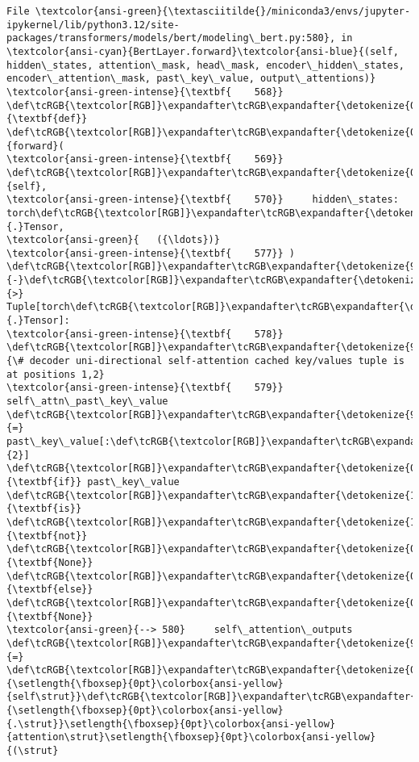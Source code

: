\documentclass[11pt]{article}
\begin{document}
\begin{Verbatim}[commandchars=\\\{\}, frame=single, framerule=2mm, rulecolor=\color{outerrorbackground}]
File \textcolor{ansi-green}{\textasciitilde{}/miniconda3/envs/jupyter-ipykernel/lib/python3.12/site-packages/transformers/models/bert/modeling\_bert.py:580}, in \textcolor{ansi-cyan}{BertLayer.forward}\textcolor{ansi-blue}{(self, hidden\_states, attention\_mask, head\_mask, encoder\_hidden\_states, encoder\_attention\_mask, past\_key\_value, output\_attentions)}
\textcolor{ansi-green-intense}{\textbf{    568}} \def\tcRGB{\textcolor[RGB]}\expandafter\tcRGB\expandafter{\detokenize{0,135,0}}{\textbf{def}} \def\tcRGB{\textcolor[RGB]}\expandafter\tcRGB\expandafter{\detokenize{0,0,255}}{forward}(
\textcolor{ansi-green-intense}{\textbf{    569}}     \def\tcRGB{\textcolor[RGB]}\expandafter\tcRGB\expandafter{\detokenize{0,135,0}}{self},
\textcolor{ansi-green-intense}{\textbf{    570}}     hidden\_states: torch\def\tcRGB{\textcolor[RGB]}\expandafter\tcRGB\expandafter{\detokenize{98,98,98}}{.}Tensor,
\textcolor{ansi-green}{   ({\ldots})}
\textcolor{ansi-green-intense}{\textbf{    577}} ) \def\tcRGB{\textcolor[RGB]}\expandafter\tcRGB\expandafter{\detokenize{98,98,98}}{-}\def\tcRGB{\textcolor[RGB]}\expandafter\tcRGB\expandafter{\detokenize{98,98,98}}{>} Tuple[torch\def\tcRGB{\textcolor[RGB]}\expandafter\tcRGB\expandafter{\detokenize{98,98,98}}{.}Tensor]:
\textcolor{ansi-green-intense}{\textbf{    578}}     \def\tcRGB{\textcolor[RGB]}\expandafter\tcRGB\expandafter{\detokenize{95,135,135}}{\# decoder uni-directional self-attention cached key/values tuple is at positions 1,2}
\textcolor{ansi-green-intense}{\textbf{    579}}     self\_attn\_past\_key\_value \def\tcRGB{\textcolor[RGB]}\expandafter\tcRGB\expandafter{\detokenize{98,98,98}}{=} past\_key\_value[:\def\tcRGB{\textcolor[RGB]}\expandafter\tcRGB\expandafter{\detokenize{98,98,98}}{2}] \def\tcRGB{\textcolor[RGB]}\expandafter\tcRGB\expandafter{\detokenize{0,135,0}}{\textbf{if}} past\_key\_value \def\tcRGB{\textcolor[RGB]}\expandafter\tcRGB\expandafter{\detokenize{175,0,255}}{\textbf{is}} \def\tcRGB{\textcolor[RGB]}\expandafter\tcRGB\expandafter{\detokenize{175,0,255}}{\textbf{not}} \def\tcRGB{\textcolor[RGB]}\expandafter\tcRGB\expandafter{\detokenize{0,135,0}}{\textbf{None}} \def\tcRGB{\textcolor[RGB]}\expandafter\tcRGB\expandafter{\detokenize{0,135,0}}{\textbf{else}} \def\tcRGB{\textcolor[RGB]}\expandafter\tcRGB\expandafter{\detokenize{0,135,0}}{\textbf{None}}
\textcolor{ansi-green}{--> 580}     self\_attention\_outputs \def\tcRGB{\textcolor[RGB]}\expandafter\tcRGB\expandafter{\detokenize{98,98,98}}{=} \def\tcRGB{\textcolor[RGB]}\expandafter\tcRGB\expandafter{\detokenize{0,135,0}}{\setlength{\fboxsep}{0pt}\colorbox{ansi-yellow}{self\strut}}\def\tcRGB{\textcolor[RGB]}\expandafter\tcRGB\expandafter{\detokenize{98,98,98}}{\setlength{\fboxsep}{0pt}\colorbox{ansi-yellow}{.\strut}}\setlength{\fboxsep}{0pt}\colorbox{ansi-yellow}{attention\strut}\setlength{\fboxsep}{0pt}\colorbox{ansi-yellow}{(\strut}

\end{Verbatim}
\end{document}
